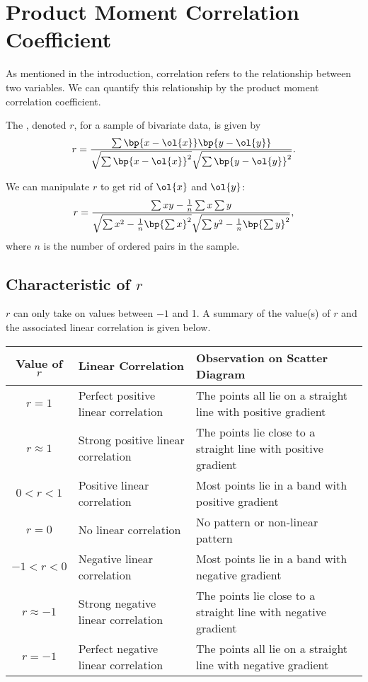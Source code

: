\section{Product Moment Correlation Coefficient}

As mentioned in the introduction, correlation refers to the relationship between two variables. We can quantify this relationship by the product moment correlation coefficient.

\begin{definition}
    The , denoted $r$, for a sample of bivariate data, is given by \[r = \frac{\sum \bp{x - \ol{x}} \bp{y - \ol{y}}}{\sqrt{\sum \bp{x - \ol{x}}^2} \sqrt{\sum \bp{y - \ol{y}}^2}}.\]
\end{definition}

We can manipulate $r$ to get rid of $\ol{x}$ and $\ol{y}$: \[r = \frac{\sum xy - \frac1n \sum x \sum y}{\sqrt{\sum x^2 - \frac1n \bp{\sum x}^2} \sqrt{\sum y^2 - \frac1n \bp{\sum y}^2}},\] where $n$ is the number of ordered pairs in the sample.

\subsection{Characteristic of $r$}

$r$ can only take on values between $-1$ and 1. A summary of the value(s) of $r$ and the associated linear correlation is given below.

\begin{table}[H]
    \centering
    \begin{tabularx}{\textwidth}{|c|>{\centering\arraybackslash}X|>{\centering\arraybackslash}X|}
        \hline
        \textbf{Value of $r$} & \textbf{Linear Correlation} & \textbf{Observation on Scatter Diagram} \\ \hline\hline
        $r = 1$ & Perfect positive linear correlation & The points all lie on a straight line with positive gradient \\ \hline
        $r \approx 1$ & Strong positive linear correlation & The points lie close to a straight line with positive gradient \\ \hline
        $0 < r < 1$ & Positive linear correlation & Most points lie in a band with positive gradient \\ \hline
        $r = 0$ & No linear correlation & No pattern or non-linear pattern \\ \hline
        $-1 < r < 0$ & Negative linear correlation & Most points lie in a band with negative gradient \\ \hline
        $r \approx -1$ & Strong negative linear correlation & The points lie close to a straight line with negative gradient \\ \hline
        $r = -1$ & Perfect negative linear correlation & The points all lie on a straight line with negative gradient \\ \hline
    \end{tabularx}
\end{table}


